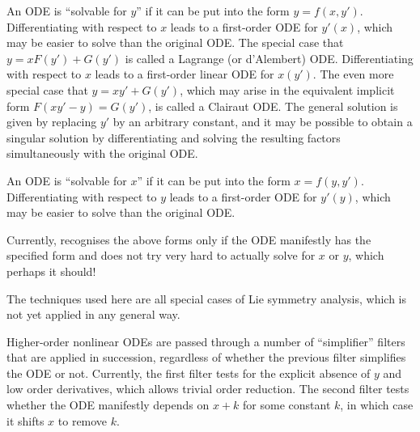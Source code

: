 An ODE is ``solvable for $y$'' if it can be put into the form $y =
f(x,y')$.  Differentiating with respect to $x$ leads to a first-order
ODE for $y'(x)$, which may be easier to solve than the original ODE.
The special case that $y = xF(y') + G(y')$ is called a Lagrange (or
d'Alembert) ODE\@.  Differentiating with respect to $x$ leads to a
first-order linear ODE for $x(y')$.  The even more special case that
$y = x y' + G(y')$, which may arise in the equivalent implicit form
$F(xy'-y) = G(y')$, is called a Clairaut ODE\@.  The general solution is
given by replacing $y'$ by an arbitrary constant, and it may be
possible to obtain a singular solution by differentiating and solving
the resulting factors simultaneously with the original ODE.

An ODE is ``solvable for $x$'' if it can be put into the form $x =
f(y,y')$.  Differentiating with respect to $y$ leads to a first-order
ODE for $y'(y)$, which may be easier to solve than the original ODE.

Currently,  recognises the above forms only if the ODE
manifestly has the specified form and does not try very hard to
actually solve for $x$ or $y$, which perhaps it should!



The techniques used here are all special cases of Lie symmetry
analysis, which is not yet applied in any general way.

Higher-order nonlinear ODEs are passed through a number of
``simplifier'' filters that are applied in succession, regardless of
whether the previous filter simplifies the ODE or not.  Currently, the
first filter tests for the explicit absence of $y$ and low order
derivatives, which allows trivial order reduction.  The second filter
tests whether the ODE manifestly depends on $x+k$ for some constant
$k$, in which case it shifts $x$ to remove $k$.

